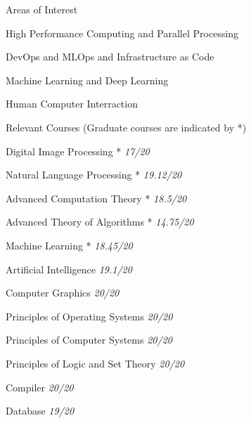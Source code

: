 \documentclass[]{main}
\begin{document}
\begin{section}{Areas of Interest}
 \begin{subsectionbullet}
     \item High Performance Computing and Parallel Processing
     \item DevOps and MLOps and Infrastructure as Code
     \item Machine Learning and Deep Learning
     \item Human Computer Interraction
 \end{subsectionbullet}
\end{section}


\begin{section}{Relevant Courses \small{(Graduate courses are indicated by *)}}
 \begin{multicols}{2}
     \begin{subsectionbullet}
         \item Digital Image Processing * \hfill \textit{17/20}
         \item Natural Language Processing * \hfill \textit{19.12/20}
         \item Advanced Computation Theory * \hfill \textit{18.5/20}
         \item Advanced Theory of Algorithms * \hfill \textit{14.75/20}
         \item Machine Learning * \hfill \textit{18.45/20}
         \item Artificial Intelligence \hfill \textit{19.1/20}
         \item Computer Graphics \hfill \textit{20/20}
         \item Principles of Operating Systems \hfill \textit{20/20}
         \item Principles of Computer Systems \hfill \textit{20/20}
         \item Principles of Logic and Set Theory \hfill \textit{20/20}
         \item Compiler \hfill \textit{20/20}
         \item Database \hfill \textit{19/20}
     \end{subsectionbullet}
 \end{multicols}
\end{section}
\end{document}
